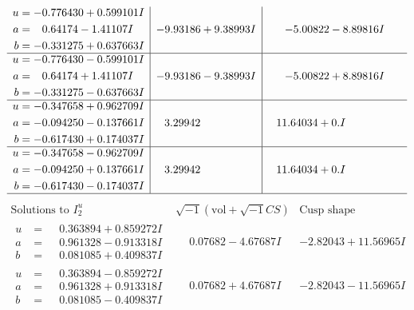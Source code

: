 \documentclass[1p]{elsarticle_modified}
\theoremstyle{definition}
\newcommand{\I}{\sqrt{-1}}
\begin{document}
$$\begin{array}{c|c|c}
\begin{aligned}
u &= -0.776430 + 0.599101 I \\
a &= \phantom{-}0.64174 - 1.41107 I \\
b &= -0.331275 + 0.637663 I\end{aligned}
 & -9.93186 + 9.38993 I & -5.00822 - 8.89816 I \\ \hline\begin{aligned}
u &= -0.776430 - 0.599101 I \\
a &= \phantom{-}0.64174 + 1.41107 I \\
b &= -0.331275 - 0.637663 I\end{aligned}
 & -9.93186 - 9.38993 I & -5.00822 + 8.89816 I \\ \hline\begin{aligned}
u &= -0.347658 + 0.962709 I \\
a &= -0.094250 - 0.137661 I \\
b &= -0.617430 + 0.174037 I\end{aligned}
 & \phantom{-}3.29942\phantom{ +0.000000I} & \phantom{-}11.64034 + 0. I\phantom{ +0.000000I} \\ \hline\begin{aligned}
u &= -0.347658 - 0.962709 I \\
a &= -0.094250 + 0.137661 I \\
b &= -0.617430 - 0.174037 I\end{aligned}
 & \phantom{-}3.29942\phantom{ +0.000000I} & \phantom{-}11.64034 + 0. I\phantom{ +0.000000I}\\
 \hline 
 \end{array}$$\newpage$$\begin{array}{c|c|c}  
\text{Solutions to }I^u_{2}& \I (\text{vol} + \sqrt{-1}CS) & \text{Cusp shape}\\
 \hline 
\begin{aligned}
u &= \phantom{-}0.363894 + 0.859272 I \\
a &= \phantom{-}0.961328 - 0.913318 I \\
b &= \phantom{-}0.081085 + 0.409837 I\end{aligned}
 & \phantom{-}0.07682 - 4.67687 I & -2.82043 + 11.56965 I \\ \hline\begin{aligned}
u &= \phantom{-}0.363894 - 0.859272 I \\
a &= \phantom{-}0.961328 + 0.913318 I \\
b &= \phantom{-}0.081085 - 0.409837 I\end{aligned}
 & \phantom{-}0.07682 + 4.67687 I & -2.82043 - 11.56965 I \\ \hline\begin{aligned}

\end{aligned}
\end{array}$$
\end{document}
